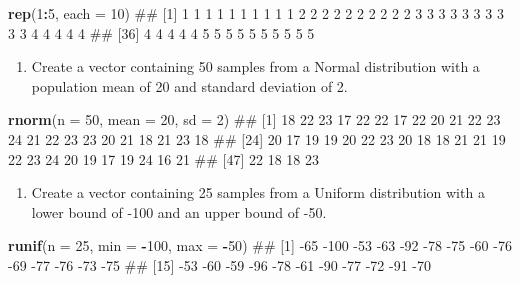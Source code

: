 \documentclass[]{book}
\newenvironment{Shaded}{\begin{snugshade}}{\end{snugshade}}
\newcommand{\KeywordTok}[1]{\textcolor[rgb]{0.13,0.29,0.53}{\textbf{#1}}}
\newcommand{\DataTypeTok}[1]{\textcolor[rgb]{0.13,0.29,0.53}{#1}}
\newcommand{\DecValTok}[1]{\textcolor[rgb]{0.00,0.00,0.81}{#1}}
\newcommand{\OperatorTok}[1]{\textcolor[rgb]{0.81,0.36,0.00}{\textbf{#1}}}
\newcommand{\NormalTok}[1]{#1}
\providecommand{\tightlist}{%
  \setlength{\itemsep}{0pt}\setlength{\parskip}{0pt}}
\theoremstyle{definition}
\theoremstyle{definition}
\theoremstyle{remark}
\begin{document}
\begin{Shaded}
\begin{Highlighting}[]
\KeywordTok{rep}\NormalTok{(}\DecValTok{1}\OperatorTok{:}\DecValTok{5}\NormalTok{, }\DataTypeTok{each =} \DecValTok{10}\NormalTok{)}
\NormalTok{##  [1] 1 1 1 1 1 1 1 1 1 1 2 2 2 2 2 2 2 2 2 2 3 3 3 3 3 3 3 3 3 3 4 4 4 4 4}
\NormalTok{## [36] 4 4 4 4 4 5 5 5 5 5 5 5 5 5 5}
\end{Highlighting}
\end{Shaded}

\begin{enumerate}
\def\labelenumi{\arabic{enumi}.}
\setcounter{enumi}{7}
\tightlist
\item
  Create a vector containing 50 samples from a Normal distribution with
  a population mean of 20 and standard deviation of 2.
\end{enumerate}

\begin{Shaded}
\begin{Highlighting}[]
\KeywordTok{rnorm}\NormalTok{(}\DataTypeTok{n =} \DecValTok{50}\NormalTok{, }\DataTypeTok{mean =} \DecValTok{20}\NormalTok{, }\DataTypeTok{sd =} \DecValTok{2}\NormalTok{)}
\NormalTok{##  [1] 18 22 23 17 22 22 17 22 20 21 22 23 24 21 22 23 23 20 21 18 21 23 18}
\NormalTok{## [24] 20 17 19 19 20 22 23 20 18 18 21 21 19 22 23 24 20 19 17 19 24 16 21}
\NormalTok{## [47] 22 18 18 23}
\end{Highlighting}
\end{Shaded}

\begin{enumerate}
\def\labelenumi{\arabic{enumi}.}
\setcounter{enumi}{8}
\tightlist
\item
  Create a vector containing 25 samples from a Uniform distribution with
  a lower bound of -100 and an upper bound of -50.
\end{enumerate}

\begin{Shaded}
\begin{Highlighting}[]
\KeywordTok{runif}\NormalTok{(}\DataTypeTok{n =} \DecValTok{25}\NormalTok{, }\DataTypeTok{min =} \OperatorTok{-}\DecValTok{100}\NormalTok{, }\DataTypeTok{max =} \OperatorTok{-}\DecValTok{50}\NormalTok{)}
\NormalTok{##  [1]  -65 -100  -53  -63  -92  -78  -75  -60  -76  -69  -77  -76  -73  -75}
\NormalTok{## [15]  -53  -60  -59  -96  -78  -61  -90  -77  -72  -91  -70}
\end{Highlighting}
\end{Shaded}
\end{document}
